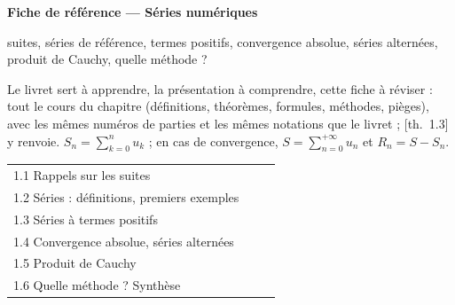 \documentclass[a4paper,10pt]{article}
\newcommand{\livre}[1]{{\sffamily\scriptsize\color{Gris}[#1]}}
\begin{document}
\thispagestyle{empty}
\noindent\colorbox{Bleu}{\parbox{\dimexpr\linewidth-2\fboxsep}{\vspace{0.4em}
{\color{white}\sffamily\scriptsize{}}\par\smallskip
{\color{white}\sffamily\bfseries\LARGE Fiche de référence --- Séries numériques}\par\smallskip
{\color{white!85!Bleu}\sffamily suites, séries de référence, termes positifs, convergence absolue, séries alternées, produit de Cauchy, quelle méthode ?}\vspace{0.4em}}}

\vspace{0.6em}
{\small Le livret sert à apprendre, la présentation à comprendre, cette fiche à réviser : tout le cours du chapitre (définitions, théorèmes, formules, méthodes, pièges), avec les mêmes numéros de parties et les mêmes notations que le livret ; \livre{th.~1.3} y renvoie. $S_n=\sum_{k=0}^nu_k$ ; en cas de convergence, $S=\sum_{n=0}^{+\infty}u_n$ et $R_n=S-S_n$.}

\vspace{0.4em}
{\small\sffamily\noindent\begin{tabular}{@{}p{0.6\linewidth}@{}}
1.1 Rappels sur les suites \dotfill\pageref{n11}\\
1.2 Séries : définitions, premiers exemples \dotfill\pageref{n12}\\
1.3 Séries à termes positifs \dotfill\pageref{n13}\\
1.4 Convergence absolue, séries alternées \dotfill\pageref{n14}\\
1.5 Produit de Cauchy \dotfill\pageref{n15}\\
1.6 Quelle méthode ? Synthèse \dotfill\pageref{n16}\\
\end{tabular}}
\end{document}
